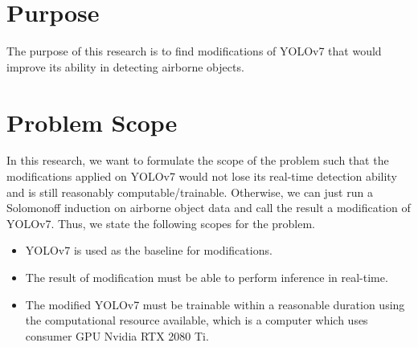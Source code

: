 \section{Purpose}
    The purpose of this research is to find modifications of YOLOv7 that would improve its ability in detecting airborne objects.

\section{Problem Scope}
    In this research, we want to formulate the scope of the problem such that the modifications applied
    on YOLOv7 would not lose its real-time detection ability and is still reasonably computable/trainable.
    Otherwise, we can just run a Solomonoff induction on airborne object data and call the result a modification
    of YOLOv7. Thus, we state the following scopes for the problem.
    \begin{itemize}%
        \item YOLOv7 is used as the baseline for modifications. 
        \item The result of modification must be able to perform inference in real-time.
        \item The modified YOLOv7 must be trainable within a reasonable duration using the computational resource
        available, which is a computer which uses consumer GPU Nvidia RTX 2080 Ti.
    \end{itemize}

